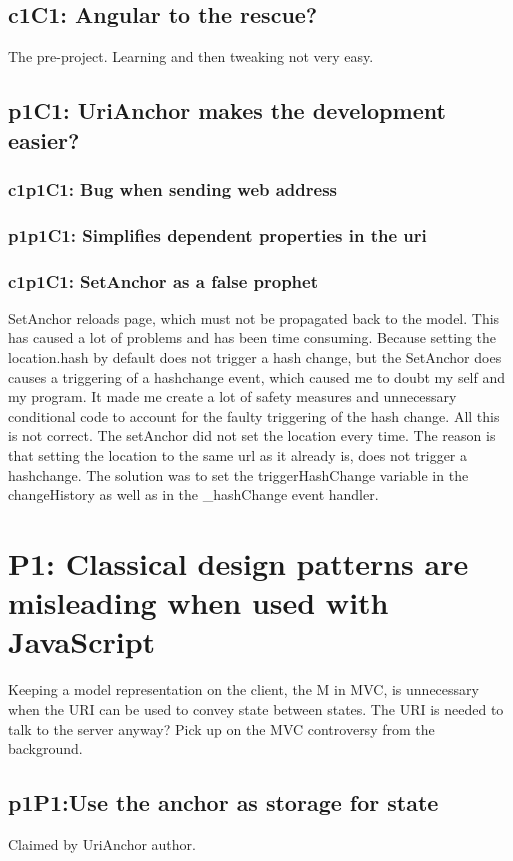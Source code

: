 \documentclass[english]{ifimaster}
\begin{document}
\subsection{c1C1: Angular to the rescue?}
The pre-project. Learning and then tweaking not very easy.
\subsection{p1C1: UriAnchor makes the development easier?}
\subsubsection{c1p1C1: Bug when sending web address}
\subsubsection{p1p1C1: Simplifies dependent properties in the uri}
\subsubsection{c1p1C1: SetAnchor as a false prophet} 
SetAnchor reloads page, which must not be propagated back to the model. This has caused a lot of problems and has been time consuming. Because setting the location.hash by default does not trigger a hash change, but the SetAnchor does causes a triggering of a hashchange event, which caused me to doubt my self and my program. It made me create a lot of safety measures and unnecessary conditional code to account for the faulty triggering of the hash change. All this is not correct. The setAnchor did not set the location every time. The reason is that setting the location to the same url as it already is, does not trigger a hashchange. The solution was to set the triggerHashChange variable in the changeHistory as well as in the \_hashChange event handler.

\section{P1: Classical design patterns are misleading when used with JavaScript}
Keeping a model representation on the client, the M in MVC, is unnecessary when the URI can be used to convey state between states. The URI is needed to talk to the server anyway?  Pick up on the MVC controversy from the background.
\subsection{p1P1:Use the anchor as storage for state}
Claimed by UriAnchor author.
\end{document}
